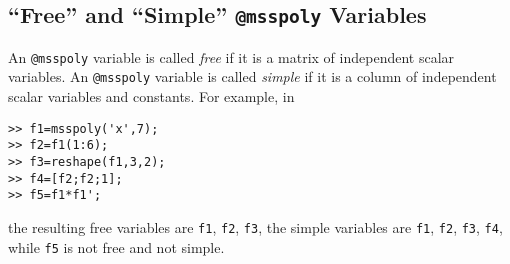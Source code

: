 \documentclass[12pt]{article}
\newcounter{example}
\begin{document}
\subsection{``Free'' and ``Simple'' {\tt @msspoly} Variables}
An {\tt @msspoly} variable is called {\sl free} if it is a matrix of
independent scalar variables. An {\tt @msspoly} variable is called {\sl simple} 
if it is a column of
independent scalar variables and constants. For example, in 
\begin{verbatim}
>> f1=msspoly('x',7);
>> f2=f1(1:6);
>> f3=reshape(f1,3,2);
>> f4=[f2;f2;1];
>> f5=f1*f1';
\end{verbatim}
the resulting free variables are {\tt f1}, {\tt f2}, {\tt f3}, 
the simple variables are
{\tt f1}, {\tt f2}, {\tt f3}, {\tt f4}, while {\tt f5} is not free and not simple.
\end{document}
